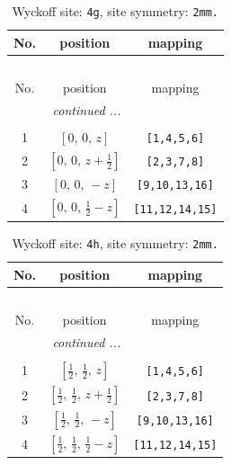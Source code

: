 \documentclass[fleqn,8pt]{jsarticle}
\begin{document}
\begin{longtable}{ccc}
\caption{Wyckoff site: {\tt 4g}, site symmetry: {\tt 2mm.}}
 \\
 \hline \hline
No. & position & mapping \\ \hline \endfirsthead

\multicolumn{2}{l}{\tablename\ \thetable{}} \\
 \hline \hline
No. & position & mapping \\ \hline \endhead

 \hline \hline
\multicolumn{2}{r}{\footnotesize\it continued ...} \\ \endfoot

 \hline \hline
\multicolumn{2}{r}{} \\ \endlastfoot

1 & $\left[ 0,\, 0,\, z \right]$ & {\tt [1,4,5,6]} \\ \hline
2 & $\left[ 0,\, 0,\, z + \frac{1}{2} \right]$ & {\tt [2,3,7,8]} \\ \hline
3 & $\left[ 0,\, 0,\, - z \right]$ & {\tt [9,10,13,16]} \\ \hline
4 & $\left[ 0,\, 0,\, \frac{1}{2} - z \right]$ & {\tt [11,12,14,15]} \\
\end{longtable}
\renewcommand{\arraystretch}{1.2}
\begin{longtable}{ccc}
\caption{Wyckoff site: {\tt 4h}, site symmetry: {\tt 2mm.}}
 \\
 \hline \hline
No. & position & mapping \\ \hline \endfirsthead

\multicolumn{2}{l}{\tablename\ \thetable{}} \\
 \hline \hline
No. & position & mapping \\ \hline \endhead

 \hline \hline
\multicolumn{2}{r}{\footnotesize\it continued ...} \\ \endfoot

 \hline \hline
\multicolumn{2}{r}{} \\ \endlastfoot

1 & $\left[ \frac{1}{2},\, \frac{1}{2},\, z \right]$ & {\tt [1,4,5,6]} \\ \hline
2 & $\left[ \frac{1}{2},\, \frac{1}{2},\, z + \frac{1}{2} \right]$ & {\tt [2,3,7,8]} \\ \hline
3 & $\left[ \frac{1}{2},\, \frac{1}{2},\, - z \right]$ & {\tt [9,10,13,16]} \\ \hline
4 & $\left[ \frac{1}{2},\, \frac{1}{2},\, \frac{1}{2} - z \right]$ & {\tt [11,12,14,15]} \\
\end{longtable}
\end{document}
